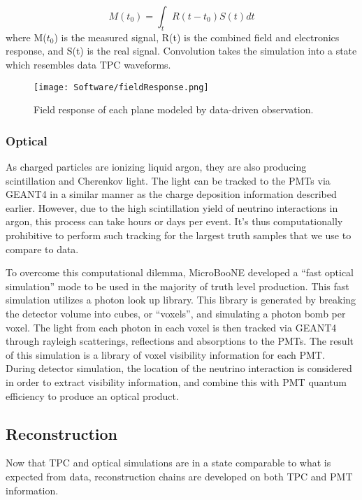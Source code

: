 \begin{equation}
\label{eq:conv}
M(t_0) = \int_{t} R(t - t_0) S(t) dt
\end{equation}
where M($t_0$) is the measured signal, R(t) is the combined field and electronics response, and S(t) is the real signal.  Convolution takes the simulation into a state which resembles data TPC waveforms. 

\begin{figure}[H]
\centering
\texttt{[image: Software/fieldResponse.png]}
\caption{Field response of each plane modeled by data-driven observation. }
\label{fig:fieldResponse}
\end{figure}

\subsubsection{Optical}
As charged particles are ionizing liquid argon, they are also producing scintillation and Cherenkov light. The light can be  tracked to the PMTs via GEANT4 in a similar manner as the charge deposition information described earlier. However, due to the high scintillation yield of neutrino interactions in argon, this process can take hours or days per event. It's thus computationally prohibitive to perform such tracking for the largest truth samples that we use to compare to data.  
\par To overcome this computational dilemma, MicroBooNE developed a “fast optical simulation” mode to be used in the majority of truth level production.  This fast simulation utilizes a photon look up library. This library is generated by breaking the detector volume into cubes, or ``voxels'', and simulating a photon bomb per voxel.  The light from each photon in each voxel is then tracked via GEANT4 through rayleigh scatterings, reflections and absorptions to the PMTs. The result of this simulation is a library of voxel visibility information for each PMT.  During detector simulation, the location of the neutrino interaction is considered in order to extract visibility information, and combine this with PMT quantum efficiency to produce an optical product.  
 
\subsection{Reconstruction}
\label{sec:reco}
Now that TPC and optical simulations are in a state comparable to what is expected from data, reconstruction chains are developed on both TPC and PMT information. 
